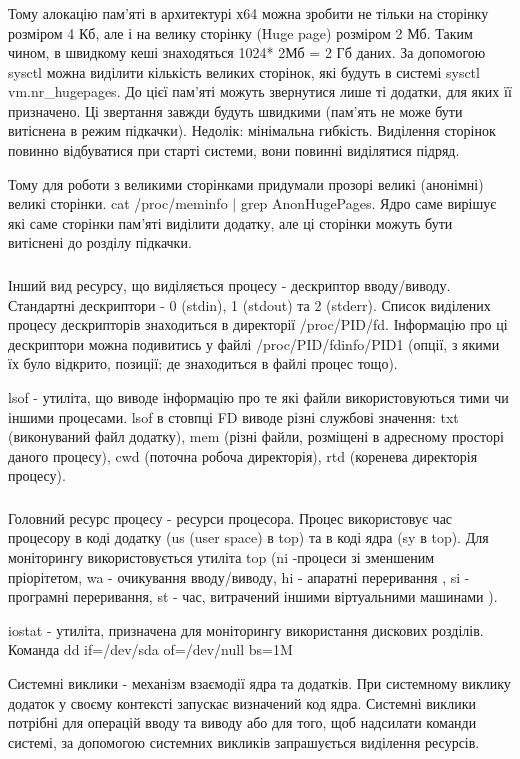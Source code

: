 \documentclass[t]{beamer}  %
\begin{document}
\begin{frame}
 	\frametitle{\insertsection} 
 	\framesubtitle{\insertsubsection}
Тому алокацію пам'яті в архитектурі х64 можна зробити не тільки на сторінку розміром 4 Кб, але і на велику сторінку (Huge page) розміром 2 Мб. Таким чином, в швидкому кеші знаходяться 1024* 2Мб = 2 Гб даних.
 За допомогою sysctl можна виділити кількість великих сторінок, які будуть в системі sysctl vm.nr\_hugepages. До цієї пам'яті можуть звернутися лише ті додатки, для яких її призначено. Ці звертання завжди будуть швидкими (пам'ять не може бути витіснена в режим підкачки). Недолік: мінімальна гибкість. Виділення сторінок повинно відбуватися при старті системи, вони повинні виділятися підряд.
 
 Тому для роботи з великими сторінками придумали прозорі великі (анонімні) великі сторінки. cat /proc/meminfo $|$ grep AnonHugePages. Ядро саме вирішує які саме сторінки пам'яті виділити додатку, але ці сторінки можуть бути витіснені до розділу підкачки.
\end{frame}

\begin{frame}
 	\frametitle{\insertsection} 
 	\framesubtitle{\insertsubsection}
Інший вид ресурсу, що виділяється процесу - дескриптор вводу/виводу. Стандартні дескриптори - 0 (stdin), 1 (stdout) та 2 (stderr). Список виділених процесу дескрипторів знаходиться в директорії /proc/PID/fd. Інформацію про ці дескриптори можна подивитись у файлі /proc/PID/fdinfo/PID1 (опції, з якими їх було відкрито, позиції; де знаходиться в файлі процес тощо).

lsof - утиліта, що виводе інформацію про те які файли використовуються тими чи іншими процесами. lsof в стовпці FD виводе різні службові значення: txt (виконуваний файл додатку), mem (різні файли, розміщені в адресному просторі даного процесу), cwd (поточна робоча директорія), rtd (коренева директорія процесу).
\end{frame}

\begin{frame}
 	\frametitle{\insertsection} 
 	\framesubtitle{\insertsubsection}
Головний ресурс процесу - ресурси процесора. Процес використовує час  процесору в коді додатку (us (user space) в top) та в коді ядра (sy в top). Для моніторингу використовується утиліта top (ni -процеси зі зменшеним пріорітетом, wa - очикування вводу/виводу, hi - апаратні переривання , si - програмні переривання, st - час, витрачений іншими віртуальними машинами ).

iostat - утиліта, призначена для моніторингу використання дискових розділів. Команда dd if=/dev/sda of=/dev/null bs=1M

Системні виклики - механізм взаємодії ядра та додатків. При системному виклику додаток у своєму контексті запускає визначений код ядра. Системні виклики потрібні для операцій вводу та виводу або для того, щоб надсилати команди системі, за допомогою системних викликів запрашується виділення ресурсів.
\end{frame}
\end{document}
